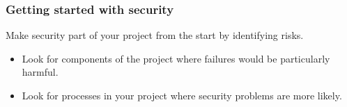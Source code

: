 \documentclass[10pt]{beamer}
\begin{document}
\begin{frame}
	\frametitle{Getting started with security}

	Make security part of your project from the start by identifying risks.

	\begin{itemize}
		\item Look for components of the project where
			failures would be particularly harmful.
		\item Look for processes in your project where security
			problems are more likely.
	\end{itemize}
\end{frame}
\end{document}
